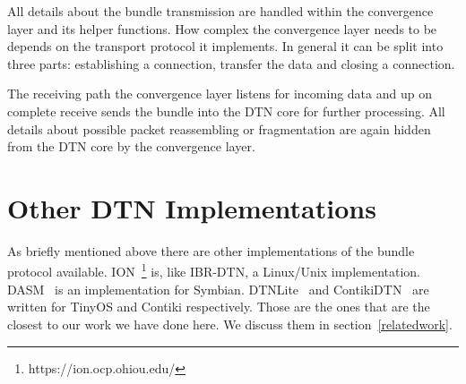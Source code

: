 All details about the bundle transmission are handled within the convergence
layer and its helper functions. How complex the convergence layer needs to be
depends on the transport protocol it implements. In general it can be split into
three parts: establishing a connection, transfer the data and closing a
connection.

The receiving path the convergence layer listens for incoming data and up on
complete receive sends the bundle into the DTN core for further processing. All
details about possible packet reassembling or fragmentation are again hidden
from the DTN core by the convergence layer.

\section{Other DTN Implementations}
As briefly mentioned above there are other implementations of the bundle
protocol available. ION~\footnote{https://ion.ocp.ohiou.edu/} is, like IBR-DTN,
a Linux/Unix implementation. DASM~\cite{dasm} is an implementation for Symbian.
DTNLite~\cite{dtnlite} and ContikiDTN~\cite{contikidtn} are written for TinyOS and
Contiki respectively. Those are the ones that are the closest to our work we
have done here. We discuss them in section~\ref{relatedwork}.
